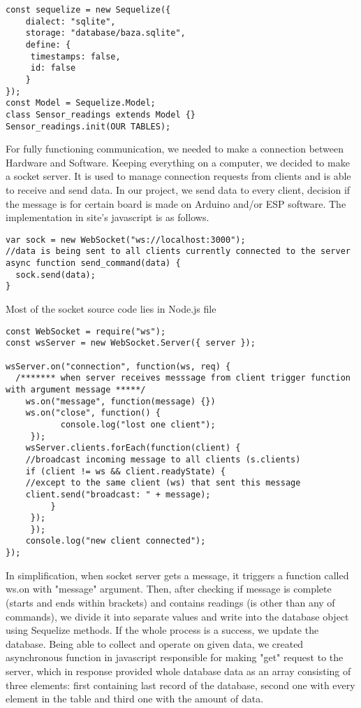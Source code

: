 \documentclass[oneside,a4paper,11pt]{report}
\begin{document}
\begin{lstlisting}[style=JavaScript]
const sequelize = new Sequelize({
	dialect: "sqlite",
	storage: "database/baza.sqlite",
	define: {
	 timestamps: false,
	 id: false
	}
});
const Model = Sequelize.Model;
class Sensor_readings extends Model {}
Sensor_readings.init(OUR TABLES);
\end{lstlisting}
\hspace{1cm}For fully functioning communication, we needed to make a connection between Hardware and Software. Keeping everything on a computer, we decided to make a socket server. It is used to manage connection requests from clients and is able to receive and send data. In our project, we send data to every client, decision if the message is for certain board is made on Arduino and/or ESP software. The implementation in site's javascript is as follows.
\begin{lstlisting}[style=JavaScript]
var sock = new WebSocket("ws://localhost:3000");
//data is being sent to all clients currently connected to the server
async function send_command(data) {
  sock.send(data);
}
\end{lstlisting}
\hspace{1cm}Most of the socket source code lies in Node.js file
\begin{lstlisting}[style=JavaScript]
const WebSocket = require("ws");
const wsServer = new WebSocket.Server({ server });

wsServer.on("connection", function(ws, req) {
  /******* when server receives messsage from client trigger function with argument message *****/
	ws.on("message", function(message) {})
	ws.on("close", function() {
    	   console.log("lost one client");
 	 });
	wsServer.clients.forEach(function(client) {
	//broadcast incoming message to all clients (s.clients)
	if (client != ws && client.readyState) {
	//except to the same client (ws) that sent this message
	client.send("broadcast: " + message);
     	 }
   	 });
 	 });
	console.log("new client connected");
});
\end{lstlisting}
\hspace{1cm}In simplification, when socket server gets a message, it triggers a function called ws.on with "message" argument. Then, after checking if message is complete (starts and ends within brackets) and contains readings (is other than any of commands), we divide it into separate values and write into the database object using Sequelize methods. If the whole process is a success, we update the database.\newpage
\hspace{0.5cm}Being able to collect and operate on given data, we created asynchronous function in javascript responsible for making "get" request to the server, which in response provided whole database data as an array consisting of three elements: first containing last record of the database, second one with every element in the table and third one with the amount of data.
\end{document}
